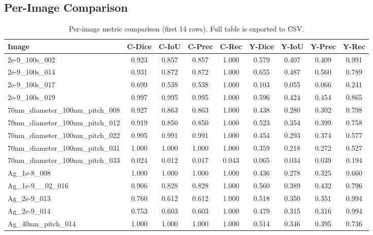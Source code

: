 \documentclass[11pt,a4paper]{article}
\begin{document}
\subsection*{Per-Image Comparison}
\begin{table}[H]
\centering
\scriptsize
\begin{tabular}{lcccccccc}
\toprule
Image & C-Dice & C-IoU & C-Prec & C-Rec & Y-Dice & Y-IoU & Y-Prec & Y-Rec \\
\midrule
2e-9\_100s\_002 & 0.923 & 0.857 & 0.857 & 1.000 & 0.579 & 0.407 & 0.409 & 0.991 \\

2e-9\_100s\_014 & 0.931 & 0.872 & 0.872 & 1.000 & 0.655 & 0.487 & 0.560 & 0.789 \\

2e-9\_100s\_017 & 0.699 & 0.538 & 0.538 & 1.000 & 0.103 & 0.055 & 0.066 & 0.241 \\

2e-9\_100s\_019 & 0.997 & 0.995 & 0.995 & 1.000 & 0.596 & 0.424 & 0.454 & 0.865 \\

70nm\_diameter\_100nm\_pitch\_008 & 0.927 & 0.863 & 0.863 & 1.000 & 0.438 & 0.280 & 0.302 & 0.798 \\

70nm\_diameter\_100nm\_pitch\_012 & 0.919 & 0.850 & 0.850 & 1.000 & 0.523 & 0.354 & 0.399 & 0.758 \\

70nm\_diameter\_100nm\_pitch\_022 & 0.995 & 0.991 & 0.991 & 1.000 & 0.454 & 0.293 & 0.374 & 0.577 \\

70nm\_diameter\_100nm\_pitch\_031 & 1.000 & 1.000 & 1.000 & 1.000 & 0.359 & 0.218 & 0.272 & 0.527 \\

70nm\_diameter\_100nm\_pitch\_033 & 0.024 & 0.012 & 0.017 & 0.043 & 0.065 & 0.034 & 0.039 & 0.194 \\

Ag\_1e-8\_008 & 1.000 & 1.000 & 1.000 & 1.000 & 0.436 & 0.278 & 0.325 & 0.660 \\

Ag\_1e-9\_\_02\_016 & 0.906 & 0.828 & 0.828 & 1.000 & 0.560 & 0.389 & 0.432 & 0.796 \\

Ag\_2e-9\_013 & 0.760 & 0.612 & 0.612 & 1.000 & 0.518 & 0.350 & 0.351 & 0.994 \\

Ag\_2e-9\_014 & 0.753 & 0.603 & 0.603 & 1.000 & 0.479 & 0.315 & 0.316 & 0.994 \\

Ag\_40nm\_pitch\_014 & 1.000 & 1.000 & 1.000 & 1.000 & 0.514 & 0.346 & 0.395 & 0.736 \\
\bottomrule
\end{tabular}
\caption{Per-image metric comparison (first 14 rows). Full table is exported to CSV.}
\end{table}
\end{document}
